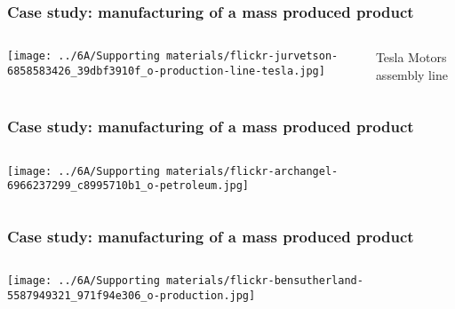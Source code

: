 \begin{frame}\frametitle{Case study: manufacturing of a mass produced product}
	\begin{columns}[b]
				\centerline{\texttt{[image: ../6A/Supporting materials/flickr-jurvetson-6858583426\_39dbf3910f\_o-production-line-tesla.jpg]}}
			Tesla Motors assembly line
	\end{columns}
\end{frame}

\begin{frame}\frametitle{Case study: manufacturing of a mass produced product}
	\begin{columns}[b]
 				\centerline{\texttt{[image: ../6A/Supporting materials/flickr-archangel-6966237299\_c8995710b1\_o-petroleum.jpg]}}


	\end{columns}
\end{frame}
	
\begin{frame}\frametitle{Case study: manufacturing of a mass produced product}
	\begin{columns}[b]
				\centerline{\texttt{[image: ../6A/Supporting materials/flickr-bensutherland-5587949321\_971f94e306\_o-production.jpg]}}

	\end{columns}
\end{frame}

